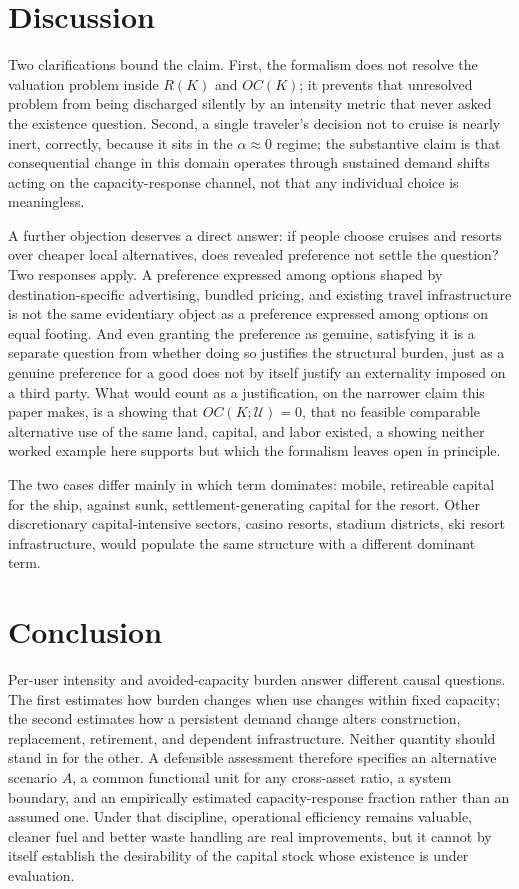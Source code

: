 \documentclass[11pt]{article}
\begin{document}
\section{Discussion}

Two clarifications bound the claim. First, the formalism does not resolve the valuation problem inside $R(K)$ and $OC(K)$; it prevents that unresolved problem from being discharged silently by an intensity metric that never asked the existence question. Second, a single traveler's decision not to cruise is nearly inert, correctly, because it sits in the $\alpha \approx 0$ regime; the substantive claim is that consequential change in this domain operates through sustained demand shifts acting on the capacity-response channel, not that any individual choice is meaningless.

A further objection deserves a direct answer: if people choose cruises and resorts over cheaper local alternatives, does revealed preference not settle the question? Two responses apply. A preference expressed among options shaped by destination-specific advertising, bundled pricing, and existing travel infrastructure is not the same evidentiary object as a preference expressed among options on equal footing. And even granting the preference as genuine, satisfying it is a separate question from whether doing so justifies the structural burden, just as a genuine preference for a good does not by itself justify an externality imposed on a third party. What would count as a justification, on the narrower claim this paper makes, is a showing that $OC(K;\mathcal{U}) = 0$, that no feasible comparable alternative use of the same land, capital, and labor existed, a showing neither worked example here supports but which the formalism leaves open in principle.

The two cases differ mainly in which term dominates: mobile, retireable capital for the ship, against sunk, settlement-generating capital for the resort. Other discretionary capital-intensive sectors, casino resorts, stadium districts, ski resort infrastructure, would populate the same structure with a different dominant term.

\section{Conclusion}

Per-user intensity and avoided-capacity burden answer different causal questions. The first estimates how burden changes when use changes within fixed capacity; the second estimates how a persistent demand change alters construction, replacement, retirement, and dependent infrastructure. Neither quantity should stand in for the other. A defensible assessment therefore specifies an alternative scenario $A$, a common functional unit for any cross-asset ratio, a system boundary, and an empirically estimated capacity-response fraction rather than an assumed one. Under that discipline, operational efficiency remains valuable, cleaner fuel and better waste handling are real improvements, but it cannot by itself establish the desirability of the capital stock whose existence is under evaluation.
\end{document}
